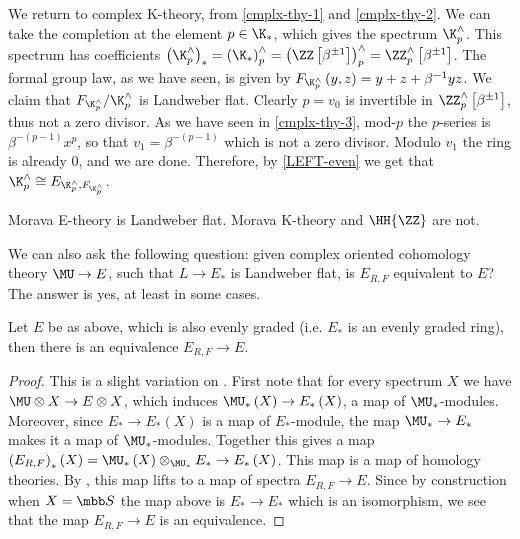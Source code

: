 \begin{example}\label{cmplx-thy-4}
	We return to complex K-theory, from \ref{cmplx-thy-1} and \ref{cmplx-thy-2}.
	We can take the completion at the element $p \in \K_*$, which gives the spectrum $\K_p^\wedge$.
	This spectrum has coefficients
	$
	\left(\K_p^\wedge\right)_*
	= \left(\K_*\right)_p^\wedge
	= \left(\ZZ\left[\beta^{\pm 1}\right]\right)_p^\wedge
	= \ZZ_p^\wedge\left[\beta^{\pm 1}\right]
	$.
	The formal group law, as we have seen, is given by $F_{\K_p^\wedge}\left(y,z\right) = y + z + \beta^{-1} y z$.
	We claim that $F_{\K_p^\wedge}/\K_p^\wedge$ is Landweber flat.
	Clearly $p = v_0$ is invertible in $\ZZ_p^\wedge\left[\beta^{\pm 1}\right]$, thus not a zero divisor.
	As we have seen in \ref{cmplx-thy-3}, mod-$p$ the $p$-series is $\beta^{-\left(p-1\right)} x^p$, so that $v_1 = \beta^{-\left(p-1\right)}$ which is not a zero divisor.
	Modulo $v_1$ the ring is already $0$, and we are done.
	Therefore, by \ref{LEFT-even} we get that $\K_p^\wedge \cong E_{\K_p^\wedge, F_{\K_p^\wedge}}$.
\end{example}

\begin{example}
	Morava E-theory is Landweber flat.
	Morava K-theory and $\HH{\ZZ}$ are not.
\end{example}

We can also ask the following question: given complex oriented cohomology theory $\MU \to E$, such that $L \to E_*$ is Landweber flat, is $E_{R,F}$ equivalent to $E$?
The answer is yes, at least in some cases.

\begin{theorem}\label{LEFT-even}
	Let $E$ be as above, which is also evenly graded (i.e. $E_*$ is an evenly graded ring), then there is an equivalence $E_{R,F} \to E$.
\end{theorem}

\begin{proof}
	This is a slight variation on \cite[18, proposition 11]{Lur}.
	First note that for every spectrum $X$ we have $\MU \otimes X \to E \otimes X$, which induces $\MU_*\left(X\right) \to E_*\left(X\right)$, a map of $\MU_*$-modules.
	Moreover, since $E_* \to E_*\left(X\right)$ is a map of $E_*$-module, the map $\MU_* \to E_*$ makes it a map of $\MU_*$-modules.
	Together this gives a map $\left(E_{R,F}\right)_*\left(X\right) = \MU_*\left(X\right) \otimes_{\MU_*} E_* \to E_*\left(X\right)$.
	This map is a map of homology theories. 
	By \cite[17, theorem 6]{Lur} , this map lifts to a map of spectra $E_{R,F} \to E$.
	Since by construction when $X = \SS$ the map above is $E_* \to E_*$ which is an isomorphism, we see that the map $E_{R,F} \to E$ is an equivalence.
\end{proof}



